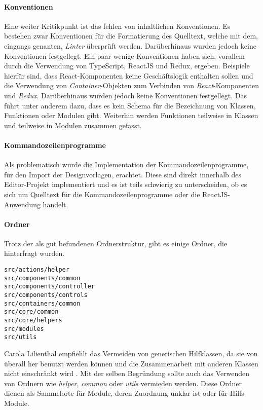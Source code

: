\paragraph{Konventionen}
Eine weiter Kritikpunkt ist das fehlen von inhaltlichen Konventionen. Es bestehen zwar Konventionen für die Formatierung des Quelltext, welche mit dem, eingangs genanten, \textit{Linter} überprüft werden. Darüberhinaus wurden jedoch keine Konventionen festgellegt. 
Ein paar wenige Konventionen haben sich, vorallem durch die Verwendung von TypeScript, ReactJS und Redux, ergeben. Beispiele hierfür sind, dass React-Komponenten keine Geschäftslogik enthalten sollen und die Verwendung von \textit{Container}-Objekten zum Verbinden von \textit{React}-Komponenten und \textit{Redux}.
Darüberhinaus wurden jedoch keine Konventionen festgellegt.
Das führt unter anderem dazu, dass es kein Schema für die Bezeichnung von Klassen, Funktionen oder Modulen gibt. Weiterhin werden Funktionen teilweise in Klassen und teilweise in Modulen zusammen gefasst. 

\paragraph{Kommandozeilenprogramme} 
Als problematisch wurde die Implementation der Kommandozeilenprogramme, für den Import der Designvorlagen, erachtet. Diese sind direkt innerhalb des Editor-Projekt implementiert und es ist teils schwierig zu unterscheiden, ob es sich um Quelltext für die Kommandozeilenprogramme oder die ReactJS-Anwendung handelt. 

\paragraph{Ordner} Trotz der als gut befundenen Ordnerstruktur, gibt es einige Ordner, die hinterfragt wurden.
\lstset{language=sh}
\begin{lstlisting}
src/actions/helper
src/components/common
src/components/controller
src/components/controls
src/containers/common
src/core/common
src/core/helpers
src/modules
src/utils
\end{lstlisting}

Carola Lilienthal empfiehlt das Vermeiden von generischen Hilfklassen, da sie von überall her benutzt werden können und die Zusammenarbeit mit anderen Klassen nicht einschränkt wird \autocite[vgl.][159]{Lilienthal2019}.    
Mit der selben Begründung sollte auch das Verwenden von Ordnern wie \textit{helper}, \textit{common} oder \textit{utils} vermieden werden. Diese Ordner dienen als Sammelorte für Module, deren Zuordnung unklar ist oder für Hilfs-Module. 

